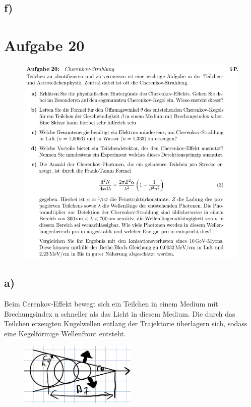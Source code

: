 \subsection{f)}


\section{Aufgabe 20}

    \begin{figure}[H]
        \centering
        \includegraphics[width=\textwidth]{images/Aufgabe20.jpg}
        \label{fig:3}
    \end{figure}


\subsection{a)}
Beim Cerenkov-Effekt bewegt sich ein Teilchen in einem Medium mit Brechungsindex n schneller als das Licht in diesem Medium.
Die durch das Teilchen erzeugten Kugelwellen entlang der Trajektorie überlagern sich, sodass eine Kegelförmige Wellenfront
entsteht.
\begin{figure}
    \centering
    \includegraphics[width=0.5\textwidth]{images/kegel.jpg}
\end{figure}

